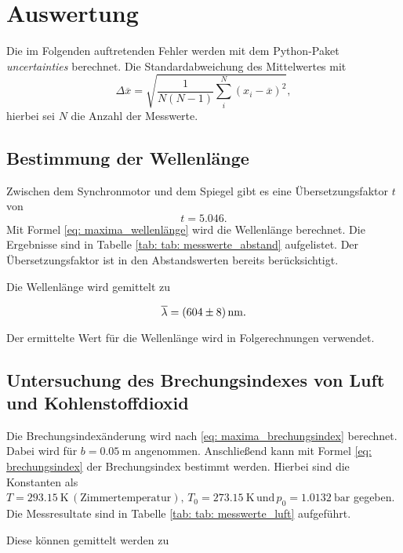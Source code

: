 \newpage
\section{Auswertung}

Die im Folgenden auftretenden Fehler werden mit dem
Python-Paket \emph{uncertainties}\cite{uncertainties} berechnet.
Die Standardabweichung des Mittelwertes mit
\begin{equation}
  \label{eq:standartabweichung}
  \Delta\overline{x}=\sqrt{\frac{1}{N(N-1)}\sum_{i}^N \left(x_i-\overline{x}\right)^2},
\end{equation}
hierbei sei $N$ die Anzahl der Messwerte.

\subsection{Bestimmung der Wellenlänge}
Zwischen dem Synchronmotor und dem Spiegel gibt es eine Übersetzungsfaktor $t$ von
\begin{equation*}
  t=5.046. %
\end{equation*}
Mit Formel \eqref{eq: maxima_wellenlänge} wird die Wellenlänge berechnet.
Die Ergebnisse sind in Tabelle \ref{tab: tab: messwerte_abstand} aufgelistet.
Der Übersetzungsfaktor ist in den Abstandswerten bereits berücksichtigt.



Die Wellenlänge wird gemittelt zu

\begin{equation}
  \label{eq:wellenlaenge}
  \overline{\lambda}=\SI{604\pm 8}{\nano\meter}.
\end{equation}

Der ermittelte Wert für die Wellenlänge wird in Folgerechnungen verwendet.

\subsection{Untersuchung des Brechungsindexes von Luft und Kohlenstoffdioxid}

Die Brechungsindexänderung wird nach \eqref{eq: maxima_brechungsindex} berechnet. Dabei wird
für $b=\SI{0.05}{\meter}$ angenommen. Anschließend kann mit Formel \eqref{eq: brechungsindex}
der Brechungsindex bestimmt werden. Hierbei sind die Konstanten als $T=\SI{293.15}{\kelvin}\, \left(\text{Zimmertemperatur}\right),\, T_0=\SI{273.15}{\kelvin} \, %
\text{und} \, p_0=\SI{1.0132}{\bar}$ gegeben.\cite{anleitung401}
Die Messresultate sind in Tabelle \ref{tab: tab: messwerte_luft} aufgeführt.

Diese können gemittelt werden zu

